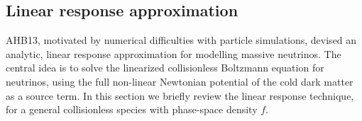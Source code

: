 \documentclass[useAMS, usenatbib]{mnras}
\newcommand{\bs}{\mathbf}
\begin{document}
%
%

\subsection{Linear response approximation} \label{sec:analytic}

AHB13, motivated by numerical difficulties with particle simulations,
devised an analytic, linear response approximation for modelling massive neutrinos. The central idea
is to solve the linearized collisionless Boltzmann equation for neutrinos,
using the full non-linear Newtonian potential of the cold dark matter as a source term.
In this section we briefly review the linear response technique,
for a general collisionless species with phase-space density $f$.
\end{document}
